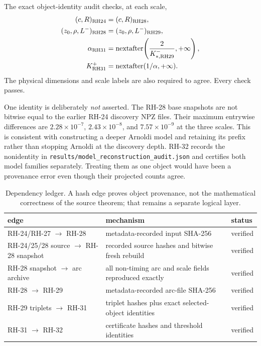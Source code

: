 \documentclass[11pt]{article}
\theoremstyle{definition}
\theoremstyle{remark}
\begin{document}
The exact object-identity audit checks, at each scale,
\begin{align}
 (c,R)_{\rm RH24}&=(c,R)_{\rm RH28},\label{eq:id-contour}\\
 (z_0,\rho,L^-)_{\rm RH28}&=(z_0,\rho,L^-)_{\rm RH29},\label{eq:id-arc}\\
 \alpha_{\rm RH31}
 &=\operatorname{nextafter}\!\left(\frac{2}{K_{*,\rm RH29}^-},+\infty\right),
 \label{eq:id-threshold}\\
 K_{\rm RH31}^+
 &=\operatorname{nextafter}(1/\alpha,+\infty).
 \label{eq:id-inverse}
\end{align}
The physical dimensions and scale labels are also required to agree.
Every check passes.

One identity is deliberately \emph{not} asserted.  The RH-28 base snapshots
are not bitwise equal to the earlier RH-24 discovery NPZ files.  Their
maximum entrywise differences are $2.28\times10^{-7}$,
$2.43\times10^{-8}$, and $7.57\times10^{-9}$ at the three scales.  This is
consistent with constructing a deeper Arnoldi model and retaining its
prefix rather than stopping Arnoldi at the discovery depth.  RH-32 records
the nonidentity in
\texttt{results/model\_reconstruction\_audit.json} and certifies both model
families separately.  Treating them as one object would have been a
provenance error even though their projected counts agree.

\begin{table}[H]
\centering
\caption{Dependency ledger.  A hash edge proves object provenance, not the
mathematical correctness of the source theorem; that remains a separate
logical layer.}
\label{tab:dependency}
\begin{tabular}{p{}p{}p{}}
\toprule
edge & mechanism & status\\
\midrule
RH-24/RH-27 $\to$ RH-28 & metadata-recorded input SHA-256 & verified\\
RH-24/25/28 source $\to$ RH-28 snapshot & recorded source hashes and bitwise fresh rebuild & verified\\
RH-28 snapshot $\to$ arc archive & all non-timing arc and scale fields reproduced exactly & verified\\
RH-28 $\to$ RH-29 & metadata-recorded arc-file SHA-256 & verified\\
RH-29 triplets $\to$ RH-31 & triplet hashes plus exact selected-object identities & verified\\
RH-31 $\to$ RH-32 & certificate hashes and threshold identities & verified\\
\bottomrule
\end{tabular}
\end{table}
\end{document}
